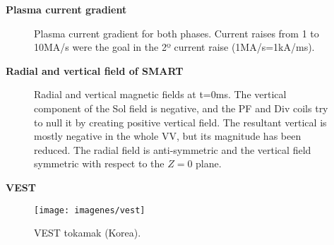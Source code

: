 \documentclass[10pt]{beamer}
\begin{document}
\begin{frame}{\bf Plasma current gradient}
	\begin{figure}[t]
	\centering
	\hfill
	\caption{Plasma current gradient for both phases. Current raises from 1 to 10MA/s were the goal in the 2º current raise (1MA/s=1kA/ms).}
	\end{figure}
\end{frame}



\begin{frame}{\bf Radial and vertical field of SMART}
	\begin{figure}[htbp]
		\centering
		\hfill
		\caption{Radial and vertical magnetic fields at t=0ms. The vertical component of the Sol field is negative, and the PF and Div coils try to null it by creating positive vertical field. The resultant vertical is mostly negative in the whole VV, but its magnitude has been reduced. The radial field is anti-symmetric and the vertical field symmetric with respect to the $Z=0$ plane.}
\end{figure}
\end{frame}




\begin{frame}{\bf VEST}

\begin{figure}
\centering
\texttt{[image: imagenes/vest]}
\caption{VEST tokamak (Korea).}
\end{figure}

\end{frame}
\end{document}
